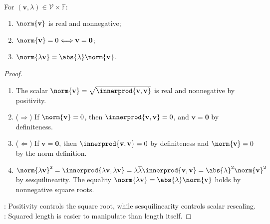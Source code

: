 \begin{proposition} \label{prop:derived-norm-basic-properties} \\
For $(\mathbf{v},\lambda)\in\mathcal{V}\times\mathbb{F}$:
\begin{enumerate}[label=(\roman*)]
\setlength{\itemsep}{0pt}
\item $\norm{\mathbf{v}}$ is real and nonnegative;
\item $\norm{\mathbf{v}}=0\Longleftrightarrow\mathbf{v}=\mathbf{0}$;
\item $\norm{\lambda\mathbf{v}}=\abs{\lambda}\norm{\mathbf{v}}$.
\end{enumerate}
\begin{proof}
\begin{enumerate}[label=(\roman*)]
\setlength{\itemsep}{0pt}
\item[$(i)$] The scalar $\norm{\mathbf{v}}=\sqrt{\innerprod{\mathbf{v},\mathbf{v}}}$ is real and nonnegative by positivity.
\item[$(ii)$] ($\Rightarrow$) If $\norm{\mathbf{v}}=0$, then $\innerprod{\mathbf{v},\mathbf{v}}=0$, and $\mathbf{v}=\mathbf{0}$ by definiteness.
\item[$(ii)$] ($\Leftarrow$) If $\mathbf{v}=\mathbf{0}$, then $\innerprod{\mathbf{v},\mathbf{v}}=0$ by definiteness and $\norm{\mathbf{v}}=0$ by the norm definition.
\item[$(iii)$] $\norm{\lambda\mathbf{v}}^2=\innerprod{\lambda\mathbf{v},\lambda\mathbf{v}}=\lambda\overline{\lambda}\innerprod{\mathbf{v},\mathbf{v}}=\abs{\lambda}^2\norm{\mathbf{v}}^2$ by sesquilinearity. The equality $\norm{\lambda\mathbf{v}}=\abs{\lambda}\norm{\mathbf{v}}$ holds by nonnegative square roots.
\end{enumerate}
: Positivity controls the square root, while sesquilinearity controls scalar rescaling.\\
: Squared length is easier to manipulate than length itself.
\end{proof}
\end{proposition}

